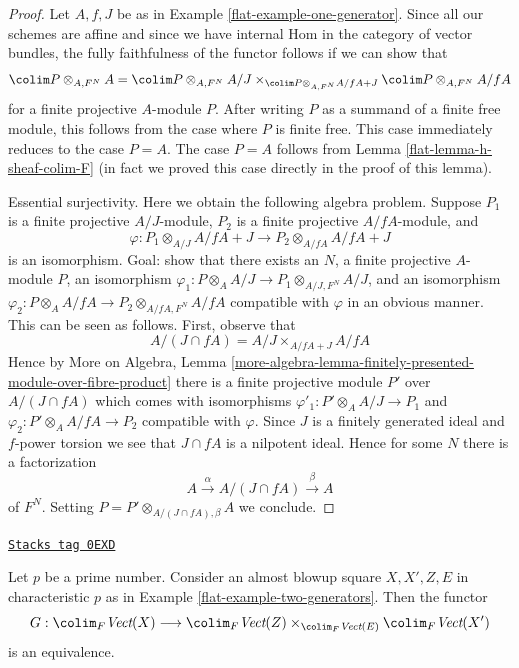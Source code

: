 \begin{proof}

Let $A, f, J$ be as in Example \ref{flat-example-one-generator}.
Since all our schemes are affine and since we have internal
Hom in the category of vector bundles, the fully faithfulness
of the functor follows if we can show that
$$
\colim P \otimes_{A, F^N} A =
\colim P \otimes_{A, F^N} A/J
\times_{\colim P \otimes_{A, F^N} A/fA + J}
\colim P \otimes_{A, F^N} A/fA
$$
for a finite projective $A$-module $P$. After writing $P$ as a summand
of a finite free module, this follows from the case where $P$ is finite
free. This case immediately reduces to the case $P = A$. The case
$P = A$ follows from Lemma \ref{flat-lemma-h-sheaf-colim-F}
(in fact we proved this case directly in the proof of this lemma).

\medskip\noindent
Essential surjectivity. Here we obtain the following algebra problem.
Suppose $P_1$ is a finite projective $A/J$-module,
$P_2$ is a finite projective $A/fA$-module, and
$$
\varphi :
P_1 \otimes_{A/J} A/fA + J
\longrightarrow
P_2 \otimes_{A/fA} A/fA + J
$$
is an isomorphism. Goal: show that there exists an $N$, a finite
projective $A$-module $P$, an isomorphism
$\varphi_1 : P \otimes_A A/J \to P_1 \otimes_{A/J, F^N} A/J$,
and an isomorphism
$\varphi_2 : P \otimes_A A/fA \to P_2 \otimes_{A/fA, F^N} A/fA$
compatible with $\varphi$ in an obvious manner.
This can be seen as follows. First, observe that
$$
A/(J \cap fA) = A/J \times_{A/fA + J} A/fA
$$
Hence by More on Algebra, Lemma
\ref{more-algebra-lemma-finitely-presented-module-over-fibre-product}
there is a finite projective module $P'$ over
$A/(J \cap fA)$ which comes with isomorphisms
$\varphi'_1 : P' \otimes_A A/J \to P_1$ and
$\varphi_2 : P' \otimes_A A/fA \to P_2$
compatible with $\varphi$. Since $J$ is a finitely generated ideal and
$f$-power torsion we see that $J \cap fA$ is a nilpotent
ideal. Hence for some $N$ there is a factorization
$$
A \xrightarrow{\alpha} A/(J \cap fA) \xrightarrow{\beta} A
$$
of $F^N$. Setting $P = P' \otimes_{A/(J \cap fA), \beta} A$
we conclude.
\end{proof}

\begin{lemma}
\label{flat-lemma-vector-bundle-II}
\href{https://stacks.math.columbia.edu/tag/0EXD}{\texttt{Stacks tag 0EXD}}

Let $p$ be a prime number. Consider an almost blowup square $X, X', Z, E$
in characteristic $p$ as in Example \ref{flat-example-two-generators}.
Then the functor
$$
G :
\colim_F \textit{Vect}(X)
\longrightarrow
\colim_F \textit{Vect}(Z)
\times_{\colim_F \textit{Vect}(E)}
\colim_F \textit{Vect}(X')
$$
is an equivalence.
\end{lemma}

